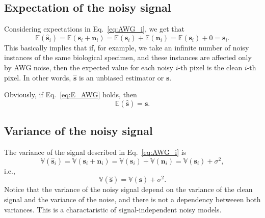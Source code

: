 \subsection{Expectation of the noisy signal}
Considering expectations in Eq.~\ref{eq:AWG_i}, we get that
\begin{equation}
  \mathbb{E}(\hat{\mathbf{s}}_i) = \mathbb{E}(\mathbf{s}_i + \mathbf{n}_i) = \mathbb{E}(\mathbf{s}_i) + \mathbb{E}(\mathbf{n}_i) = \mathbb{E}(\mathbf{s}_i) + 0 = \mathbf{s}_i.
  \label{eq:E_AWG_i}
\end{equation}
This basically implies that if, for example, we take an infinite
number of noisy instances of the same biological specimen, and these
instances are affected only by AWG noise, then the expected value for each
noisy $i$-th pixel is the clean $i$-th pixel. In other words,
$\hat{\mathbf{s}}$ is an unbiased estimator or $\mathbf{s}$.

Obviously, if Eq.~\ref{eq:E_AWG} holds, then
\begin{equation}
  \mathbb{E}(\hat{\mathbf{s}}) = \mathbf{s}.
  \label{eq:E_AWG}
\end{equation}

\begin{comment}
Considering that $\mathbf{s}$ is a constant (the
clean image is fixed for each adquisition of the image $\hat{\mathbf{s}}$),
\begin{equation}
  \mathbb{E}(\hat{\mathbf{s}}) = \mathbb{E}(\mathbf{s} + \mathbf{n}) = \mathbb{E}(\mathbf{s}) + \mathbb{E}(\mathbf{n}) = \mathbf{s} + \mathbf{0} = \mathbf{s}.
  \label{eq:E_AWG}
\end{equation}
\end{comment}

\subsection{Variance of the noisy signal}
The variance of the signal described in Eq.~\ref{eq:AWG_i} is
\begin{equation}
  \mathbb{V}(\hat{\mathbf{s}}_i) = \mathbb{V}(\mathbf{s}_i + \mathbf{n}_i) = \mathbb{V}(\mathbf{s}_i) + \mathbb{V}(\mathbf{n}_i) = \mathbb{V}(\mathbf{s}_i) + \sigma^2,
  \label{eq:V_AWG_i}
\end{equation}
i.e.,
\begin{equation}
  \mathbb{V}(\hat{\mathbf{s}}) = \mathbb{V}(\mathbf{s}) + \sigma^2.
  \label{eq:V_AWG}
\end{equation}
Notice that the variance of the noisy signal depend on the variance of
the clean signal and the variance of the noise, and there is not a
dependency betweeen both variances. This is a
charactaristic of signal-independent noisy models.

